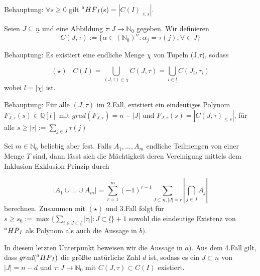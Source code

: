 \documentclass{article}
\newcommand*{\indx}[2]{{#1}_{#2}}
\newcommand*{\N}{\mathbb{N}_0}
\newcommand*{\hf}[1]{$\prescript{a}{}{HF}_{#1}$}
\newcommand*{\hp}[1]{$\prescript{a}{}{HP}_{#1}$}
\begin{document}
\begin{compactenum}
	\item Behauptung: $\forall s\geq 0$ gilt \hf{I}(s)$=|\indx{C(I)}{\leq s}|$.\\
	\item Seien $J\subseteq \underline{n}$ und eine Abbildung $\tau:J\longrightarrow \N$ gegeben. Wir definieren
	\begin{displaymath}
	C(J,\tau):=\{\alpha \in (\N)^n: \indx{\alpha}{j}=\tau(j), \forall \in J  \}
	\end{displaymath}
	
	Behauptung: Es existiert eine endliche Menge $\chi$ von Tupeln (J,$\tau$), sodass 
	
	\begin{displaymath}
	(\star)\;\;\;   C(I)=\bigcup\limits_{(J,\tau)\in \chi} C(J,\tau) =\bigcup\limits_{i\in \underline{l}} C(\indx{J}{i},\indx{\tau}{i})  
	\end{displaymath}
	wobei $l=|\chi|$ ist.\\
	\item Behauptung: Für alle $(J,\tau)$ im 2.Fall, existiert ein eindeutiges Polynom $\indx{F}{J,\tau}(s)\in \mathbb{Q}[t]$ mit $grad(\indx{F}{J,\tau})=n-|J|$ und
	$\indx{F}{J,\tau}(s)=\left|\indx{C(J,\tau)}{\leq s}\right|$, für alle $s\geq |\tau|:=\sum\limits_{j\in J}\tau(j)$\\
	\item Sei $m\in\N$ beliebig aber fest. Falls $\indx{A}{1},\ldots,\indx{A}{m}$ endliche Teilmengen von einer Menge $T$ sind, dann lässt sich die Mächtigkeit deren Vereinigung mittels dem Inklusion-Exklusion-Prinzip durch
	
	\begin{displaymath}
	\left|\indx{A}{1}\cup\ldots\cup\indx{A}{m}\right|=\sum\limits_{r=1}^{m}(-1)^{r-1}\sum\limits_{J\subset\underline{n},\left|J\right|=r}{|\bigcap\limits_{j\in J}\indx{A}{j}|}
	\end{displaymath}
	berechnen. Zusammen mit $(\star)$ und 3.Fall folgt für $s\geq \indx{s}{0}:=\max{\{\sum\limits_{i\in J\subset \underline{l}}|\indx{\tau}{i}|: J\subset \underline{l}\}}+1$ sowohl die eindeutige Existenz von \hp{I} als Polynom als auch die Aussage in $b)$. \\
	\item In diesem letzten Unterpunkt beweisen wir die Aussage in $a)$. Aus dem 4.Fall gilt, dass $grad(\textnormal{\hp{I}})$ die größte natürliche Zahl $d$ ist, sodass es ein $J\subset\underline{n}$ von $|J|=n-d$ und $\tau: J\rightarrow\N$ mit $C(J,\tau)\subset C(I)$  existiert. 
	

\end{compactenum}
\end{document}
